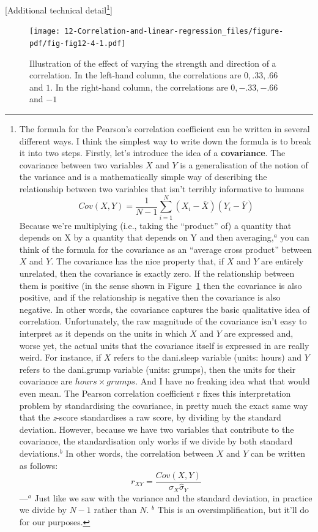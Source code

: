 \documentclass[
  a4paper,
]{book}
\begin{document}
{[}Additional technical detail\footnote{The formula for the Pearson's
  correlation coefficient can be written in several different ways. I
  think the simplest way to write down the formula is to break it into
  two steps. Firstly, let's introduce the idea of a \textbf{covariance}.
  The covariance between two variables \(X\) and \(Y\) is a
  generalisation of the notion of the variance and is a mathematically
  simple way of describing the relationship between two variables that
  isn't terribly informative to humans
  \[Cov(X,Y)=\frac{1}{N-1}\sum_{i=1}^N(X_i-\bar{X})(Y_i-\bar{Y})\]
  Because we're multiplying (i.e., taking the ``product'' of) a quantity
  that depends on X by a quantity that depends on Y and then
  averaging,\(^a\) you can think of the formula for the covariance as an
  ``average cross product'' between \(X\) and \(Y\). The covariance has
  the nice property that, if \(X\) and \(Y\) are entirely unrelated,
  then the covariance is exactly zero. If the relationship between them
  is positive (in the sense shown in Figure~\ref{fig-fig12-4} then the
  covariance is also positive, and if the relationship is negative then
  the covariance is also negative. In other words, the covariance
  captures the basic qualitative idea of correlation. Unfortunately, the
  raw magnitude of the covariance isn't easy to interpret as it depends
  on the units in which \(X\) and \(Y\) are expressed and, worse yet,
  the actual units that the covariance itself is expressed in are really
  weird. For instance, if \(X\) refers to the dani.sleep variable
  (units: hours) and \(Y\) refers to the dani.grump variable (units:
  grumps), then the units for their covariance are
  \(hours \times grumps\). And I have no freaking idea what that would
  even mean. The Pearson correlation coefficient r fixes this
  interpretation problem by standardising the covariance, in pretty much
  the exact same way that the \emph{z}-score standardises a raw score,
  by dividing by the standard deviation. However, because we have two
  variables that contribute to the covariance, the standardisation only
  works if we divide by both standard deviations.\(^b\) In other words,
  the correlation between \(X\) and \(Y\) can be written as follows:
  \[r_{XY}=\frac{Cov(X,Y)}{\hat{\sigma}_X\hat{\sigma}_Y}\]---\(^a\) Just
  like we saw with the variance and the standard deviation, in practice
  we divide by \(N - 1\) rather than \(N\). \(^b\) This is an
  oversimplification, but it'll do for our purposes.}{]}

\begin{figure}

\texttt{[image: 12-Correlation-and-linear-regression\_files/figure-pdf/fig-fig12-4-1.pdf]} \hfill{}

\caption{\label{fig-fig12-4}Illustration of the effect of varying the
strength and direction of a correlation. In the left-hand column, the
correlations are \(0, .33, .66\) and \(1\). In the right-hand column,
the correlations are \(0, -.33, -.66\) and \(-1\)}

\end{figure}
\end{document}
